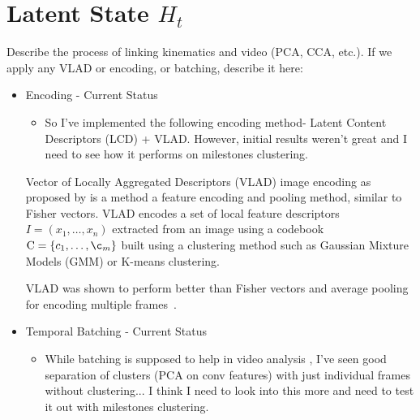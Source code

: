 \section{Latent State $H_t$}
Describe the process of linking kinematics and video (PCA, CCA, etc.).
If we apply any VLAD or encoding, or batching, describe it here:

\begin{itemize}
\item Encoding - Current Status
\begin{itemize}
\item So I've implemented the following encoding method- Latent Content Descriptors (LCD) + VLAD. However, initial results weren't great and I need to see how it performs on milestones clustering.
\end{itemize}


Vector of Locally Aggregated Descriptors (VLAD) image encoding as proposed by \cite{jegou2010aggregating} is a method a feature encoding and pooling method, similar to Fisher vectors. VLAD encodes a set of local feature descriptors $I=(x_1,\ldots,x_n)$ extracted from an image using a codebook $\mathrm{C} = \{c_1, \ldots, \c_m \}$ built using a clustering method such as Gaussian Mixture Models (GMM) or K-means clustering.


VLAD was shown to perform better than Fisher vectors and average pooling for encoding multiple frames~\cite{xu2014discriminative}.

\item Temporal Batching - Current Status
\begin{itemize}
\item While batching is supposed to help in video analysis , I've seen good separation of clusters (PCA on conv features) with just individual frames without clustering... I think I need to look into this more and need to test it out with milestones clustering.
\end{itemize}

\end{itemize}
